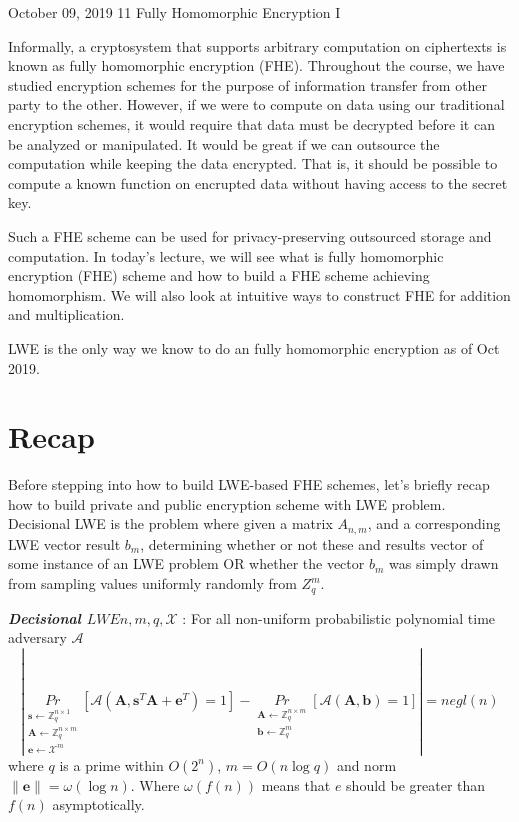 \documentclass[usletter]{article}
\begin{document}
	
           {October 09, 2019}                          %
           {11}                                       %
           {Fully Homomorphic Encryption I}  %

\newcommand{\floor}[1]{\left\lfloor #1 \right\rfloor}
\newcommand{\ceil}[1]{\left\lceil #1 \right\rceil}

Informally, a cryptosystem that supports arbitrary computation on ciphertexts is known as fully homomorphic encryption (FHE)\cite{wiki}. Throughout the course, we have studied encryption schemes for the purpose of information transfer from other party to the other. However, if we were to compute on data using our traditional encryption schemes, it would require that data must be decrypted before it can be analyzed or manipulated. It would be great if we can outsource the computation while keeping the data encrypted. That is, it should be possible to compute a known function on encrupted data without having access to the secret key. 

Such a FHE scheme can be used for privacy-preserving outsourced storage and computation. In today's lecture, we will see what is fully homomorphic encryption (FHE) scheme and how to build a FHE scheme achieving homomorphism. We will also look at intuitive ways to construct FHE for addition and multiplication.

\begin{fact}
LWE is the only way we know to do an fully homomorphic encryption as of Oct 2019. 
\end{fact}
           
\section{Recap}


Before stepping into how to build LWE-based FHE schemes, let's briefly recap how to build private and public encryption scheme with LWE problem.
Decisional LWE is the problem where given a matrix $A_{n,m}$, and a corresponding LWE vector result $b_m$, determining whether or not these 
and results vector of some instance of an LWE problem OR whether the vector $b_m$ was simply 
drawn from sampling values uniformly randomly from $Z^{m}_{q}$. 

\begin{definition}
\textbf{\textit{Decisional $LWE{n,m,q,\mathcal{X}}$}} : For all non-uniform probabilistic polynomial time adversary $\mathcal{A}$
$$|\underset{\substack{
\pmb{s}\leftarrow \mathbb{Z}_q^{n\times1}\\
\pmb{A}\leftarrow\mathbb{Z}_q^{n\times m}\\
\pmb{e}\leftarrow \mathcal{X}^m}}{Pr}
[\mathcal{A}(\pmb{A},\pmb{s}^T\pmb{A}+\pmb{e}^T)=1]
-\underset{\substack{\pmb{A}\leftarrow\mathbb{Z}_q^{n\times m}\\
\pmb{b}\leftarrow\mathbb{Z}_q^m}}{Pr} 
[\mathcal{A}(\pmb{A},\pmb{b})=1]|=negl(n)$$
where $q$ is a prime within $O(2^n)$, $m=O(n\log q)$ and norm $\parallel \pmb{e}\parallel=\omega(\log n)$. Where $\omega(f(n))$ means that 
$e$ should be greater than $f(n)$ asymptotically.
\end{definition}
\end{document}
